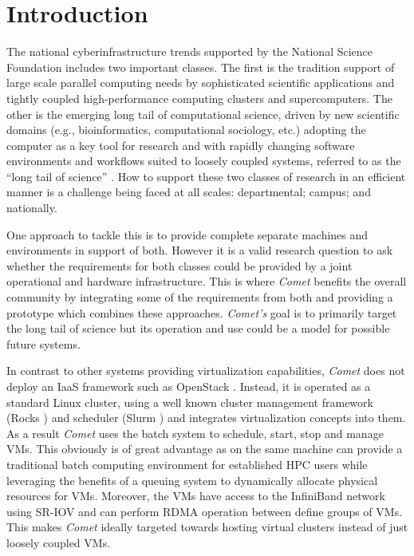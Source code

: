 \section{Introduction} \label{S:introduction}

The national cyberinfrastructure trends supported
by the National Science Foundation includes two important classes. The
first is the tradition support of large scale parallel computing needs
by sophisticated scientific applications and tightly coupled
high-performance computing clusters and supercomputers. The other is
the emerging long tail of computational science, driven by new
scientific domains (e.g., bioinformatics, computational sociology,
etc.) adopting the computer as a key tool for research and with
rapidly changing software environments and workflows suited to loosely
coupled systems, referred to as the ``long tail of
science'' \cite{comet14}. How to support these two classes of research
in an efficient manner is a challenge being faced at all scales:
departmental; campus; and nationally.

One approach to tackle this is to provide complete separate
machines and environments in support of both. However it is a valid
research question to ask whether the requirements for both classes could be provided by a joint
operational and hardware infrastructure. This is where \emph{Comet} \cite{comet14}
benefits the overall community by integrating some of
the requirements from both and providing a prototype which
combines these approaches. \emph{Comet's} goal is to primarily target
the long tail of science but its operation and use could be a model
for possible future systems.

In contrast to other systems providing virtualization capabilities,
\emph{Comet} does not deploy an IaaS framework such as OpenStack
\cite{openstack}. Instead, it is operated as a standard Linux cluster,
using a well known cluster management framework (Rocks
\cite{www-rocks}) and scheduler (Slurm \cite{slurm}) and integrates
virtualization concepts into them. As a result \emph{Comet}
uses the batch system to schedule, start, stop and manage VMs. This
obviously is of great advantage as on the same machine can provide a
traditional batch computing environment for established HPC users
while leveraging the benefits of a queuing system to dynamically
allocate physical resources for VMs. Moreover, the VMs have access to
the InfiniBand network using SR-IOV
\cite{sriov} and can perform RDMA operation between define groups of
VMs. This makes \emph{Comet} ideally targeted towards
hosting virtual clusters instead of just loosely coupled VMs.

